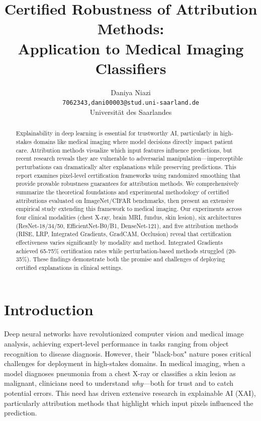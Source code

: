 \documentclass[11pt]{article}
\title{Certified Robustness of Attribution Methods: \\ Application to Medical Imaging Classifiers}
\author{Daniya Niazi \\
\texttt{7062343,dani00003@stud.uni-saarland.de} \\
Universit{\"a}t des Saarlandes}
\date{}
\begin{document}
\maketitle
\begin{abstract}
Explainability in deep learning is essential for trustworthy AI, particularly in high-stakes domains like medical imaging where model decisions directly impact patient care. Attribution methods visualize which input features influence predictions, but recent research reveals they are vulnerable to adversarial manipulation—imperceptible perturbations can dramatically alter explanations while preserving predictions. This report examines pixel-level certification frameworks using randomized smoothing that provide provable robustness guarantees for attribution methods. We comprehensively summarize the theoretical foundations and experimental methodology of certified attributions evaluated on ImageNet/CIFAR benchmarks, then present an extensive empirical study extending this framework to medical imaging. Our experiments across four clinical modalities (chest X-ray, brain MRI, fundus, skin lesion), six architectures (ResNet-18/34/50, EfficientNet-B0/B1, DenseNet-121), and five attribution methods (RISE, LRP, Integrated Gradients, GradCAM, Occlusion) reveal that certification effectiveness varies significantly by modality and method. Integrated Gradients achieved 65-75\% certification rates while perturbation-based methods struggled (20-35\%). These findings demonstrate both the promise and challenges of deploying certified explanations in clinical settings.
\end{abstract} 

\section{Introduction}

Deep neural networks have revolutionized computer vision and medical image analysis, achieving expert-level performance in tasks ranging from object recognition to disease diagnosis. However, their "black-box" nature poses critical challenges for deployment in high-stakes domains. In medical imaging, when a model diagnoses pneumonia from a chest X-ray or classifies a skin lesion as malignant, clinicians need to understand \textit{why}—both for trust and to catch potential errors. This need has driven extensive research in explainable AI (XAI), particularly attribution methods that highlight which input pixels influenced the prediction.
\end{document}

